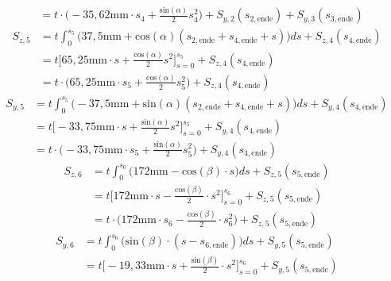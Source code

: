 \begin{itemize}
\begin{equation}
\begin{split}
	&= t\cdot\bigg(-35,62\mathrm{mm}\cdot s_4 + \frac{\mathrm{sin}(\alpha)}{2}s^2_4\bigg) + S_{y,2}(s_{2,\mathrm{ende}})  + S_{y,3}(s_{3,\mathrm{ende}})
\end{split}
\end{equation}
\begin{equation}
	\begin{split}
		S_{z,5} &= t\int_{0}^{s_5}\bigg(37,5\mathrm{mm}+\mathrm{cos}(\alpha)(s_{2,\mathrm{ende}}+s_{4,\mathrm{ende}}+s)\bigg)ds + S_{z,4}(s_{4,\mathrm{ende}})\\\
		&= t\bigg[65,25\mathrm{mm}\cdot s +\frac{\mathrm{cos}(\alpha)}{2}s^2\bigg]_{s=0}^{s_5} + S_{z,4}(s_{4,\mathrm{ende}})\\\
		&= t\cdot\bigg(65,25\mathrm{mm}\cdot s_5 +\frac{\mathrm{cos}(\alpha)}{2}s^2_5\bigg) + S_{z,4}(s_{4,\mathrm{ende}})
	\end{split}
\end{equation}
\begin{equation}
	\begin{split}
		S_{y,5} &= t\int_{0}^{s_5}\bigg(-37,5\mathrm{mm}+\mathrm{sin}(\alpha)(s_{2,\mathrm{ende}}+s_{4,\mathrm{ende}}+s)\bigg)ds + S_{y,4}(s_{4,\mathrm{ende}})\\\
		&= t\bigg[-33,75\mathrm{mm}\cdot s +\frac{\mathrm{sin}(\alpha)}{2}s^2\bigg]_{s=0}^{s_5} + S_{y,4}(s_{4,\mathrm{ende}})\\\
		&= t\cdot\bigg(-33,75\mathrm{mm}\cdot s_5 +\frac{\mathrm{sin}(\alpha)}{2}s^2_5\bigg) + S_{y,4}(s_{4,\mathrm{ende}})
	\end{split}
\end{equation}
\begin{equation}
	\begin{split}
		S_{z,6} &= t\int_{0}^{s_6}\bigg(172\mathrm{mm}-\mathrm{cos}(\beta)\cdot s\bigg)ds + S_{z,5}(s_{5,\mathrm{ende}})\\\
		&= t\bigg[172\mathrm{mm}\cdot s-\frac{\mathrm{cos}(\beta)}{2}\cdot s^2\bigg]_{s=0}^{s_6} + S_{z,5}(s_{5,\mathrm{ende}})\\\
		&= t\cdot\bigg(172\mathrm{mm}\cdot s_6-\frac{\mathrm{cos}(\beta)}{2}\cdot s^2_6\bigg) + S_{z,5}(s_{5,\mathrm{ende}})
	\end{split}
\end{equation}
\begin{equation}
	\begin{split}
	S_{y,6} &= t\int_{0}^{s_6}\bigg(\mathrm{sin}(\beta)\cdot(s-s_{6,\mathrm{ende}})\bigg)ds + S_{y,5}(s_{5,\mathrm{ende}})\\\
	&= t\bigg[-19,33\mathrm{mm}\cdot s + \frac{\mathrm{sin}(\beta)}{2}\cdot s^2\bigg]_{s=0}^{s_6} + S_{y,5}(s_{5,\mathrm{ende}})\\\

\end{split}
\end{equation}
\end{itemize}
